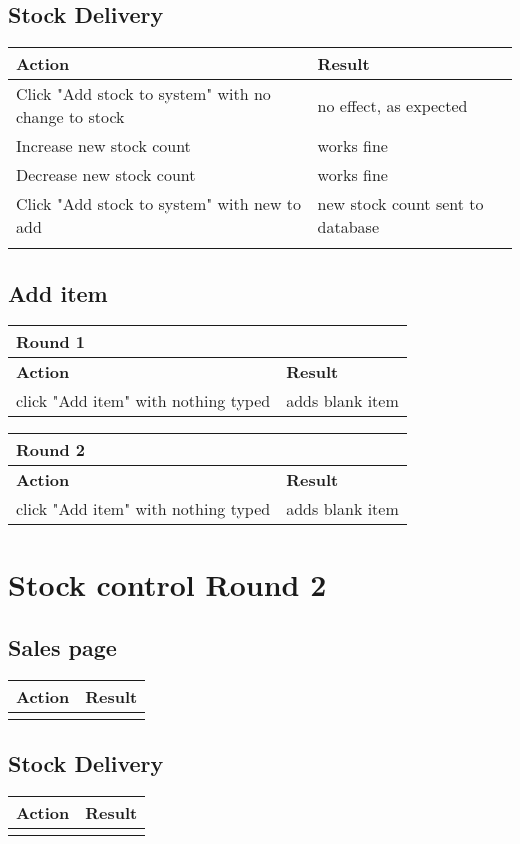 \documentclass[11pt,a4paper]{article}
\begin{document}
	\subsection{Stock Delivery}
	\begin{tabular}{|m{7cm}|m{7cm}|}
		\hline \textbf{Action} & \textbf{Result}\\
		\hline Click "Add stock to system" with no change to stock & no effect, as expected\\
		\hline Increase new stock count & works fine\\
		\hline Decrease new stock count & works fine\\
		\hline Click "Add stock to system" with new to add & new stock count sent to database\\
		\hline & \\
	\end{tabular}
	\subsection{Add item}
	\begin{tabular}{|m{7cm}|m{7cm}|}
		\hline Round 1&\\
		\hline \textbf{Action} & \textbf{Result}\\
		\hline click "Add item" with nothing typed & adds blank item \\
		\hline 
	\end{tabular}
	
		\begin{tabular}{|m{7cm}|m{7cm}|}
			\hline Round 2&\\
			\hline \textbf{Action} & \textbf{Result}\\
			\hline click "Add item" with nothing typed & adds blank item \\
			\hline 
		\end{tabular}
	
	\section{Stock control Round 2}
	\subsection{Sales page}
\begin{tabular}{|m{7cm}|m{7cm}|}
		\hline \textbf{Action} & \textbf{Result}\\
		\hline & \\
	\end{tabular}
	\subsection{Stock Delivery}
\begin{tabular}{|m{7cm}|m{7cm}|}
		\hline \textbf{Action} & \textbf{Result}\\
		\hline & \\
	\end{tabular}
\end{document}
